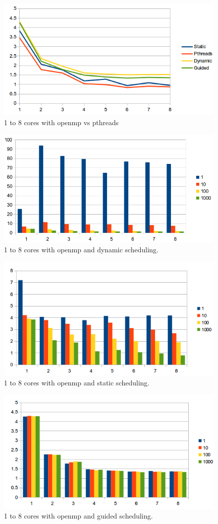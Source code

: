 \documentclass[10pt]{article}
\begin{document}
\begin{figure}
  \centering
    \includegraphics[width=\textwidth]{compare.png}
  \caption{1 to 8 cores with openmp vs pthreads}
\end{figure}
\break
\begin{figure}
  \centering
    \includegraphics[width=\textwidth]{dynamic.png}
  \caption{1 to 8 cores with openmp and dynamic scheduling.}
\end{figure}
\break
\begin{figure}
  \centering
    \includegraphics[width=\textwidth]{static.png}
  \caption{1 to 8 cores with openmp and static scheduling.}
\end{figure}
\break
\begin{figure}
  \centering
    \includegraphics[width=\textwidth]{guided.png}
  \caption{1 to 8 cores with openmp and guided scheduling.}
\end{figure}
\break
\end{document}
